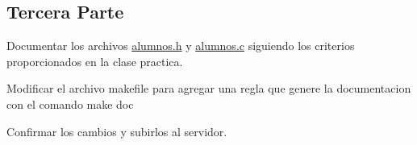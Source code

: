 \subsection*{Tercera Parte}


\begin{DoxyEnumerate}
\item Documentar los archivos {\ttfamily \hyperlink{alumnos_8h}{alumnos.\+h}} y {\ttfamily \hyperlink{alumnos_8c}{alumnos.\+c}} siguiendo los criterios proporcionados en la clase practica.
\item Modificar el archivo {\ttfamily makefile} para agregar una regla que genere la documentacion con el comando {\ttfamily make doc}
\item Confirmar los cambios y subirlos al servidor. 
\end{DoxyEnumerate}